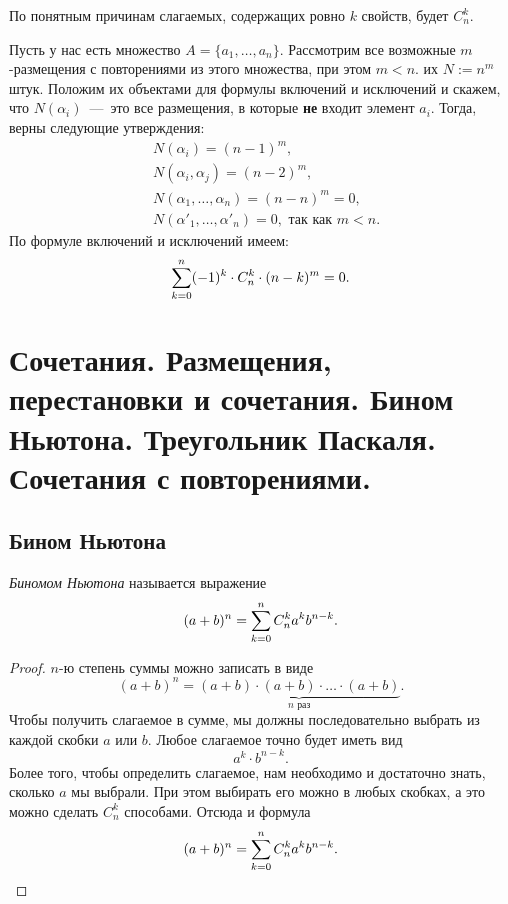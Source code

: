 \begin{multicols}{2}
\begin{note}{}{}
	По понятным причинам слагаемых, содержащих ровно $k$ свойств, будет $C_n^k$.
\end{note}

	\cons Пусть у нас есть множество $A = \{a_1, \ldots, a_n\}$. Рассмотрим все возможные $m$-размещения с повторениями из этого множества, при этом $m < n$. их $N := n^m$ штук. Положим их объектами для формулы включений и исключений и скажем, что $N(\alpha_i)$~---~это все размещения, в которые \textbf{не} входит элемент $a_i$. Тогда, верны следующие утверждения:
	\begin{align*}
		&N(\alpha_i) = (n - 1)^m,
		\\
		&N(\alpha_i, \alpha_j) = (n - 2)^m,
		\\
		&N(\alpha_1, \ldots, \alpha_n) = (n - n)^m = 0,
		\\
		&N(\alpha'_1, \ldots, \alpha'_n) = 0, \text{ так как } m < n.
	\end{align*}
	По формуле включений и исключений имеем:
	\[
		\sum\limits_{k = 0}^n (-1)^k \cdot C_n^k \cdot (n - k)^m = 0.
	\]
    \section{Сочетания. Размещения, перестановки и сочетания. Бином Ньютона. Треугольник
    Паскаля. Сочетания с повторениями.}
    \subsection*{Бином Ньютона}

    \begin{definition}{}{}
      \textit{Биномом Ньютона} называется выражение
      \[
        (a + b)^n = \sum\limits_{k = 0}^n C_n^k a^k b^{n - k}.
      \]
    \end{definition}
    
    \begin{proof}
      $n$-ю степень суммы можно записать в виде
      \[
        (a + b)^n = \underbrace{(a + b) \cdot (a + b) \cdot \ldots \cdot (a + b)}_{n \text{ раз}}.
      \]
      Чтобы получить слагаемое в сумме, мы должны последовательно выбрать из каждой скобки $a$ или $b$. Любое слагаемое точно будет иметь вид
      \[
        a^k \cdot b^{n - k}.
      \]
      Более того, чтобы определить слагаемое, нам необходимо и достаточно знать, сколько $a$ мы выбрали. При этом выбирать его можно в любых скобках, а это можно сделать $C_n^k$ способами. Отсюда и формула
      \[
        (a + b)^n = \sum\limits_{k = 0}^n C_n^k a^k b^{n - k}.
      \]
    \end{proof}
    

\end{multicols}
